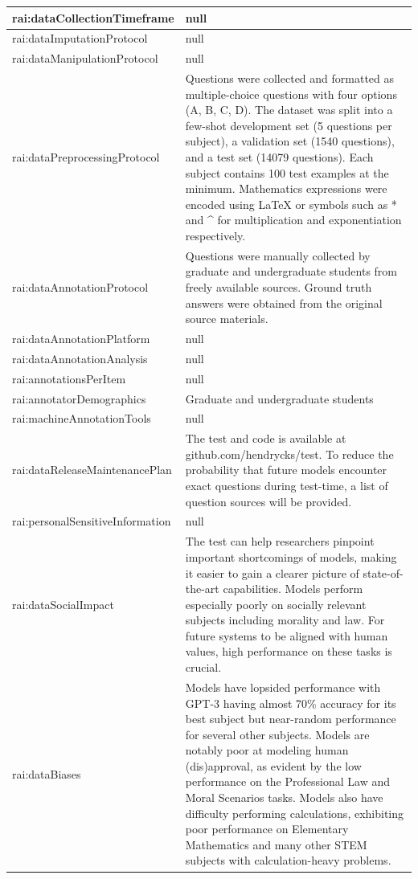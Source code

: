 \documentclass[10pt,a4paper]{article}
\begin{document}
\begin{longtable}{|p{4cm}|p{12cm}|}
\hline
rai:dataCollectionTimeframe & null \\
\hline
rai:dataImputationProtocol & null \\
\hline
rai:dataManipulationProtocol & null \\
\hline
rai:dataPreprocessingProtocol & Questions were collected and formatted as multiple-choice questions with four options (A, B, C, D). The dataset was split into a few-shot development set (5 questions per subject), a validation set (1540 questions), and a test set (14079 questions). Each subject contains 100 test examples at the minimum. Mathematics expressions were encoded using LaTeX or symbols such as * and \^{} for multiplication and exponentiation respectively. \\
\hline
rai:dataAnnotationProtocol & Questions were manually collected by graduate and undergraduate students from freely available sources. Ground truth answers were obtained from the original source materials. \\
\hline
rai:dataAnnotationPlatform & null \\
\hline
rai:dataAnnotationAnalysis & null \\
\hline
rai:annotationsPerItem & null \\
\hline
rai:annotatorDemographics & Graduate and undergraduate students \\
\hline
rai:machineAnnotationTools & null \\
\hline
rai:dataReleaseMaintenancePlan & The test and code is available at github.com/hendrycks/test. To reduce the probability that future models encounter exact questions during test-time, a list of question sources will be provided. \\
\hline
rai:personalSensitiveInformation & null \\
\hline
rai:dataSocialImpact & The test can help researchers pinpoint important shortcomings of models, making it easier to gain a clearer picture of state-of-the-art capabilities. Models perform especially poorly on socially relevant subjects including morality and law. For future systems to be aligned with human values, high performance on these tasks is crucial. \\
\hline
rai:dataBiases & Models have lopsided performance with GPT-3 having almost 70\% accuracy for its best subject but near-random performance for several other subjects. Models are notably poor at modeling human (dis)approval, as evident by the low performance on the Professional Law and Moral Scenarios tasks. Models also have difficulty performing calculations, exhibiting poor performance on Elementary Mathematics and many other STEM subjects with calculation-heavy problems. \\

\end{longtable}
\end{document}
